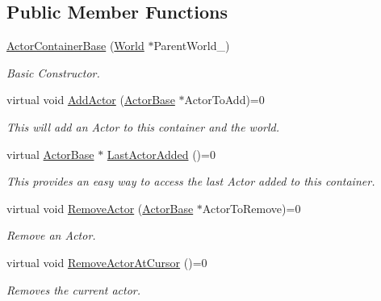 \subsection*{Public Member Functions}
\begin{DoxyCompactItemize}
\item 
\hyperlink{classphys_1_1ActorContainerBase_a629529f9002646d463ea167af1d20df2}{ActorContainerBase} (\hyperlink{classphys_1_1World}{World} $\ast$ParentWorld\_\-)
\begin{DoxyCompactList}\small\item\em Basic Constructor. \item\end{DoxyCompactList}\item 
virtual void \hyperlink{classphys_1_1ActorContainerBase_a8dd213cba4915f68ac421fc9f341cbbe}{AddActor} (\hyperlink{classphys_1_1ActorBase}{ActorBase} $\ast$ActorToAdd)=0
\begin{DoxyCompactList}\small\item\em This will add an Actor to this container and the world. \item\end{DoxyCompactList}\item 
virtual \hyperlink{classphys_1_1ActorBase}{ActorBase} $\ast$ \hyperlink{classphys_1_1ActorContainerBase_a6ccc6d058bcbbe0b9a638e28fb136477}{LastActorAdded} ()=0
\begin{DoxyCompactList}\small\item\em This provides an easy way to access the last Actor added to this container. \item\end{DoxyCompactList}\item 
virtual void \hyperlink{classphys_1_1ActorContainerBase_a523072e42f6b581d044432f84a84ede4}{RemoveActor} (\hyperlink{classphys_1_1ActorBase}{ActorBase} $\ast$ActorToRemove)=0
\begin{DoxyCompactList}\small\item\em Remove an Actor. \item\end{DoxyCompactList}\item 
virtual void \hyperlink{classphys_1_1ActorContainerBase_a60f37a056e8750f3b389c5ceed14520c}{RemoveActorAtCursor} ()=0
\begin{DoxyCompactList}\small\item\em Removes the current actor. \item\end{DoxyCompactList}\item 

\end{DoxyCompactItemize}
